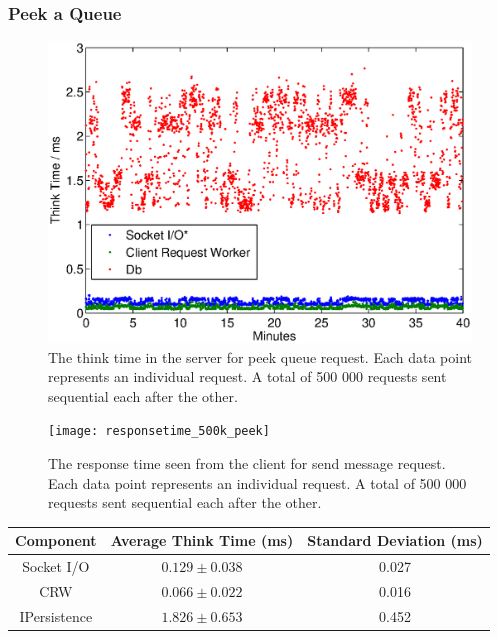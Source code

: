 \documentclass{article}
\begin{document}
        \subsubsection{Peek a Queue}
        
            \begin{figure}[H]
                \hspace{-1.5cm}
                \includegraphics[scale=0.50]{thinktime_500k_peek}
                \caption{The think time in the server for peek queue request. Each data point represents an individual request. A total of 500 000 requests sent sequential each after the other.}
                \label{fig:thinktime_500k_peek}
            \end{figure}
            
            \begin{figure}[H]
                \hspace{-1.5cm}
                \texttt{[image: responsetime\_500k\_peek]}
                \caption{The response time seen from the client for send message request. Each data point represents an individual request. A total of 500 000 requests sent sequential each after the other.}
                \label{fig:responsetime_500k_peek}
            \end{figure}
                
                \begin{tabular}{|c|c|c|}
                \hline 
            \textbf{Component} & \textbf{Average Think Time} (ms)  & \textbf{Standard Deviation (ms)} \\ 
            \hline 
            Socket I/O &$0.129\pm0.038$ &0.027\\ 
            \hline 
            CRW &$0.066\pm0.022$ &0.016\\ 
            \hline 
            IPersistence &$1.826\pm0.653$ &0.452\\ 
            \hline 
            \end{tabular} 
            
\end{document}

